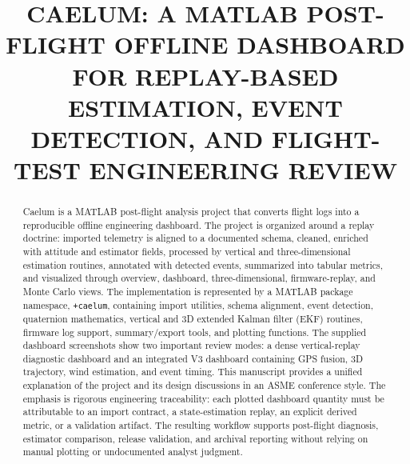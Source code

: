 \documentclass[colorlinks,upint,subscriptcorrection,varvw,hyphenate,balance]{asmeconf}
\title{CAELUM: A MATLAB POST-FLIGHT OFFLINE DASHBOARD FOR REPLAY-BASED ESTIMATION, EVENT DETECTION, AND FLIGHT-TEST ENGINEERING REVIEW}
\newcommand{\code}[1]{\texttt{\allowbreak#1}}
\newcommand{\pkg}{\code{+caelum}}
\begin{document}
\maketitle

\begin{abstract}
Caelum is a MATLAB post-flight analysis project that converts flight logs into a reproducible offline engineering dashboard. The project is organized around a replay doctrine: imported telemetry is aligned to a documented schema, cleaned, enriched with attitude and estimator fields, processed by vertical and three-dimensional estimation routines, annotated with detected events, summarized into tabular metrics, and visualized through overview, dashboard, three-dimensional, firmware-replay, and Monte Carlo views. The implementation is represented by a MATLAB package namespace, \pkg{}, containing import utilities, schema alignment, event detection, quaternion mathematics, vertical and 3D extended Kalman filter (EKF) routines, firmware log support, summary/export tools, and plotting functions. The supplied dashboard screenshots show two important review modes: a dense vertical-replay diagnostic dashboard and an integrated V3 dashboard containing GPS fusion, 3D trajectory, wind estimation, and event timing. This manuscript provides a unified explanation of the project and its design discussions in an ASME conference style. The emphasis is rigorous engineering traceability: each plotted dashboard quantity must be attributable to an import contract, a state-estimation replay, an explicit derived metric, or a validation artifact. The resulting workflow supports post-flight diagnosis, estimator comparison, release validation, and archival reporting without relying on manual plotting or undocumented analyst judgment.
\end{abstract}
\end{document}
